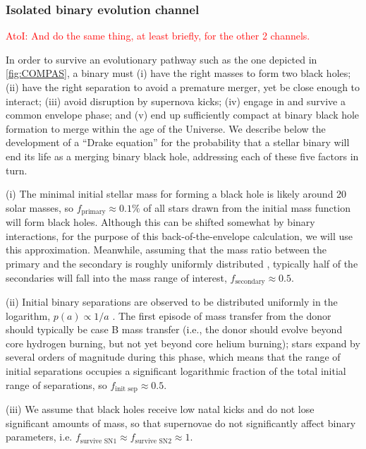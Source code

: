 \documentclass[iop,onecolumn]{revtex4}
\newcommand{\ajf}[1]{\textcolor{red}{AtoI: #1}}
\begin{document}
\subsubsection{Isolated binary evolution channel}
\ajf{And do the same thing, at least briefly, for the other 2 channels.}

In order to survive an evolutionary pathway such as the one depicted in \autoref{fig:COMPAS}, a binary must (i) have the right masses to form two black holes; (ii) have the right separation to avoid a premature merger, yet be close enough to interact; (iii) avoid disruption by supernova kicks; (iv) engage in and survive a common envelope phase; and (v) end up sufficiently compact at binary black hole formation to merge within the age of the Universe. We describe below the development of a ``Drake equation'' for the probability that a stellar binary will end its life as a merging binary black hole, addressing each of these five factors in turn.

(i) The minimal initial stellar mass for forming a black hole is likely around 20 solar masses, so $f_\textrm{primary} \approx 0.1\%$ of all stars drawn from the \citet{Kroupa:2002} initial mass function will form black holes. Although this can be shifted somewhat by binary interactions, for the purpose of this back-of-the-envelope calculation, we will use this approximation. Meanwhile, assuming that the mass ratio between the primary and the secondary is roughly uniformly distributed \citep{Sana:2012}, typically half of the secondaries will fall into the mass range of interest, $f_\textrm{secondary} \approx 0.5$.  

(ii) Initial binary  separations are observed to be distributed uniformly in the logarithm, $p(a) \propto 1/a$ \citep{Opik:1924}.  The first episode of mass transfer from the donor should typically be case B mass transfer (i.e., the donor should evolve beyond core hydrogen burning, but not yet beyond core helium burning); stars expand by several orders of magnitude during this phase, which means that the range of initial separations occupies a significant logarithmic fraction of the total initial range of separations, so $f_\textrm{init sep} \approx 0.5$.  

(iii) We assume that black holes receive low natal kicks and do not lose significant amounts of mass, so that supernovae do not significantly affect binary parameters, i.e. $f_\textrm{survive SN1} \approx f_\textrm{survive SN2} \approx 1$.  
\end{document}
